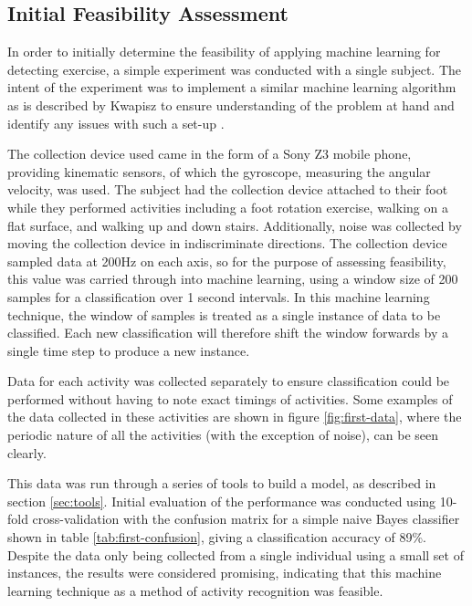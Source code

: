 \subsection{Initial Feasibility Assessment}
In order to initially determine the feasibility of applying machine learning for detecting exercise, a simple experiment was conducted with a single subject. The intent of the experiment was to implement a similar machine learning algorithm as is described by Kwapisz to ensure understanding of the problem at hand and identify any issues with such a set-up \cite{kwapisz2011activity}.

The collection device used came in the form of a Sony Z3 mobile phone, providing kinematic sensors, of which the gyroscope, measuring the angular velocity, was used. The subject had the collection device attached to their foot while they performed activities including a foot rotation exercise, walking on a flat surface, and walking up and down stairs. Additionally, noise was collected by moving the collection device in indiscriminate directions. The collection device sampled data at 200Hz on each axis, so for the purpose of assessing feasibility, this value was carried through into machine learning, using a window size of 200 samples for a classification over 1 second intervals. In this machine learning technique, the window of samples is treated as a single instance of data to be classified. Each new classification will therefore shift the window forwards by a single time step to produce a new instance.

Data for each activity was collected separately to ensure classification could be performed without having to note exact timings of activities. Some examples of the data collected in these activities are shown in figure \ref{fig:first-data}, where the periodic nature of all the activities (with the exception of noise), can be seen clearly.

This data was run through a series of tools to build a model, as described in section \ref{sec:tools}. Initial evaluation of the performance was conducted using 10-fold cross-validation with the confusion matrix for a simple naive Bayes classifier shown in table \ref{tab:first-confusion}, giving a classification accuracy of 89\%. Despite the data only being collected from a single individual using a small set of instances, the results were considered promising, indicating that this machine learning technique as a method of activity recognition was feasible.

